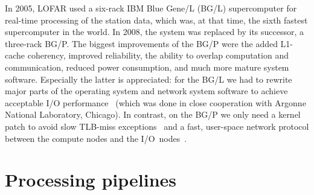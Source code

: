 In 2005, LOFAR used a six-rack IBM Blue Gene/L (BG/L) supercomputer for
real-time processing of the station data, which was, at that time, the sixth
fastest supercomputer in the world.
In 2008, the system was replaced by its successor, a three-rack BG/P.
The biggest improvements of the BG/P were the added L1-cache coherency,
improved reliability, the ability to overlap computation and communication,
reduced power consumption, and much more mature system software.
Especially the latter is appreciated: for the BG/L we had to rewrite major
parts of the operating system and network system software to achieve acceptable
I/O performance~\cite{Iskra:08,Boonstoppel:08} (which was done in close
cooperation with Argonne National Laboratory, Chicago).
In contrast, on the BG/P we only need a kernel patch to avoid slow TLB-miss
exceptions~\cite{Kazutomo:10} and a fast, user-space network protocol between
the compute nodes and the I/O~nodes~\cite{Romein:09a}.




\section{Processing pipelines}
\label{sec:processing}

